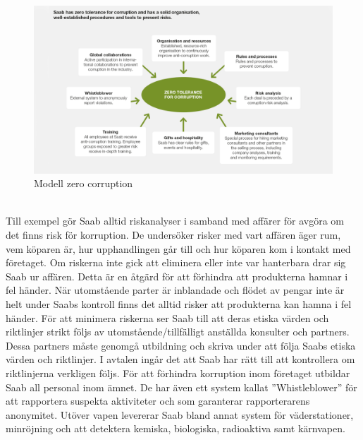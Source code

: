 \begin{figure}[h]
	\centering
	\includegraphics[scale=1.4]{grafik/modell_zero_corruption_1140x640.png}
	\caption{Modell zero corruption \citep{saabimg1}}\label{fig:zerotolerance}
\end{figure}  
\\
Till exempel gör Saab alltid riskanalyser i samband med affärer för avgöra om det finns risk för korruption. De undersöker risker med vart affären äger rum, vem köparen är, hur upphandlingen går till och hur köparen kom i kontakt med företaget. Om riskerna inte gick att eliminera eller inte var hanterbara drar sig Saab ur affären. Detta är en åtgärd för att förhindra att produkterna hamnar i fel händer. 
\newline
\newline
När utomstående parter är inblandade och flödet av pengar inte är helt under Saabs kontroll finns det alltid risker att produkterna kan hamna i fel händer. För att minimera riskerna ser Saab till att deras etiska värden och riktlinjer strikt följs av utomstående/tillfälligt anställda konsulter och partners. Dessa partners måste genomgå utbildning och skriva under att följa Saabs etiska värden och riktlinjer. I avtalen ingår det att Saab har rätt till att kontrollera om riktlinjerna verkligen följs.   
\newline
\newline
För att förhindra korruption inom företaget utbildar Saab all personal inom ämnet. De har även ett system kallat ''Whistleblower'' för att rapportera suspekta aktiviteter och som garanterar rapporterarens anonymitet.              
\newline
\newline
Utöver vapen levererar Saab bland annat system för väderstationer, minröjning och att detektera kemiska, biologiska, radioaktiva samt kärnvapen. \citep{security}

